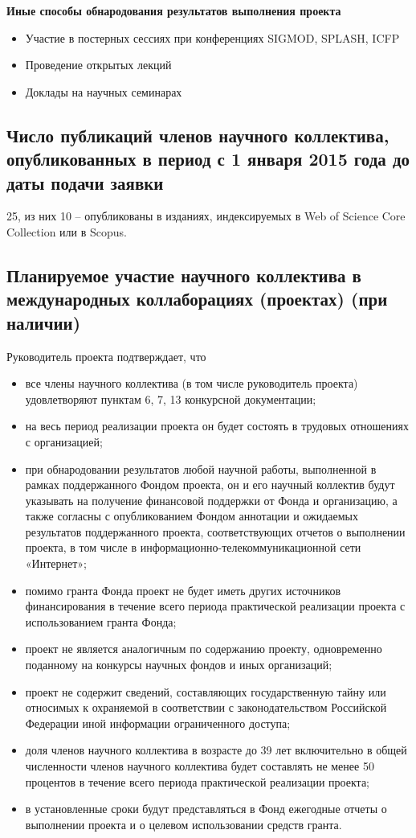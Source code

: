 \documentclass[12pt]{article}  %
\theoremstyle{remark}
\begin{document}
\textbf{Иные способы обнародования результатов выполнения проекта}
\begin{itemize}
\item Участие в постерных сессиях при конференциях SIGMOD, SPLASH, ICFP
\item Проведение открытых лекций
\item Доклады на научных семинарах
\end{itemize}

\subsection{Число публикаций членов научного коллектива, опубликованных в период с 1 января 2015 года до даты подачи заявки}

25, из них 10 – опубликованы в изданиях, индексируемых в Web of Science Core Collection или в Scopus.

\subsection{Планируемое участие научного коллектива в международных коллаборациях (проектах) (при наличии)}

\vline
Руководитель проекта подтверждает, что
\begin{itemize}
\item все члены научного коллектива (в том числе руководитель проекта) удовлетворяют пунктам 6, 7, 13 конкурсной документации;
\item на весь период реализации проекта он будет состоять в трудовых отношениях с организацией;
\item при обнародовании результатов любой научной работы, выполненной в рамках поддержанного Фондом проекта, он и его научный коллектив будут указывать на получение финансовой поддержки от Фонда и организацию, а также согласны с опубликованием Фондом аннотации и ожидаемых результатов поддержанного проекта, соответствующих отчетов о выполнении проекта, в том числе в информационно-телекоммуникационной сети «Интернет»;
\item помимо гранта Фонда проект не будет иметь других источников финансирования в течение всего периода практической реализации проекта с использованием гранта Фонда;
\item проект не является аналогичным по содержанию проекту, одновременно поданному на конкурсы научных фондов и иных организаций;
\item проект не содержит сведений, составляющих государственную тайну или относимых к охраняемой в соответствии с законодательством Российской Федерации иной информации ограниченного доступа;
\item доля членов научного коллектива в возрасте до 39 лет включительно в общей численности членов научного коллектива будет составлять не менее 50 процентов в течение всего периода практической реализации проекта;
\item в установленные сроки будут представляться в Фонд ежегодные отчеты о выполнении проекта и о целевом использовании средств гранта.
\end{itemize}
\end{document}
